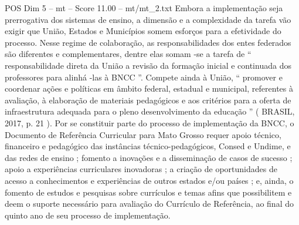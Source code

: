 \begin{textsample}{POS Dim 5 – mt – Score 11.00 – mt/mt\_2.txt}
Embora a implementação seja prerrogativa dos sistemas de ensino, a dimensão e a complexidade da tarefa vão exigir que União, Estados e Municípios somem esforços para a efetividade do processo.
Nesse regime de colaboração, as responsabilidades dos entes federados são diferentes e complementares, dentre elas somam -se a tarefa de “ responsabilidade direta da União a revisão da formação inicial e continuada dos professores para alinhá -las à BNCC ”.
Compete ainda à União, “ promover e coordenar ações e políticas em âmbito federal, estadual e municipal, referentes à avaliação, à elaboração de materiais pedagógicos e aos critérios para a oferta de infraestrutura adequada para o pleno desenvolvimento da educação ” ( BRASIL, 2017, p. 21 ).
Por se constituir parte do processo de implementação da BNCC, o Documento de Referência Curricular para Mato Grosso requer apoio técnico, financeiro e pedagógico das instâncias técnico-pedagógicos, Consed e Undime, e das redes de ensino ; fomento a inovações e a disseminação de casos de sucesso ; apoio a experiências curriculares inovadoras ; a criação de oportunidades de acesso a conhecimentos e experiências de outros estados e/ou países ; e, ainda, o fomento de estudos e pesquisas sobre currículos e temas afins que possibilitem e deem o suporte necessário para avaliação do Currículo de Referência, ao final do quinto ano de seu processo de implementação.

\end{textsample}
